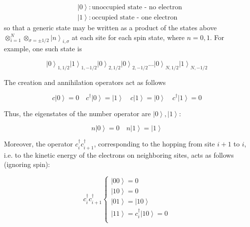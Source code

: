 \documentclass[10pt, twocolumn, twoside]{article}
\begin{document}
\begin{equation}
\begin{split}
&\left| 0 \right\rangle : \text{unoccupied state - no electron} \\
&\left| 1 \right\rangle : \text{occupied state - one electron}
\end{split}
\end{equation}
so that a generic state may be written as a product of the states above $\otimes_{i=1}^N \otimes_{\sigma = \pm 1/2} \left| n \right\rangle_{i, \sigma}$ at each site for each spin state, where $n= 0, 1$. For example, one such state is

\begin{equation}
\left| 0 \right\rangle_{1, 1/2} \left| 1 \right\rangle_{1, -1/2} \left| 0 \right\rangle_{2, 1/2} \left| 0 \right\rangle_{2, -1/2} ... \left| 0 \right\rangle_{N, 1/2} \left| 1 \right\rangle_{N, -1/2} 
\end{equation}

The creation and annihilation operators act as follows

\begin{equation}
c \left| 0 \right\rangle = 0 \quad c^\dagger \left| 0 \right\rangle = \left| 1 \right\rangle \quad c \left| 1 \right\rangle = \left| 0 \right\rangle \quad c^\dagger \left| 1 \right\rangle = 0
\end{equation}

Thus, the eigenstates of the number operator are $\left| 0 \right\rangle, \left| 1 \right\rangle$:

\begin{equation}
n \left| 0 \right\rangle = 0 \quad n \left| 1 \right\rangle = \left| 1 \right\rangle
\end{equation}

Moreover, the operator $c_i^\dagger c_{i+1}^\dagger$, corresponding to the hopping from site $i+1$ to $i$, i.e. to the kinetic energy of the electrons on neighboring sites, acts as follows (ignoring spin):

\begin{equation}
c_i^\dagger c_{i+1}^\dagger \begin{cases}
\left|0 0 \right\rangle = 0 \\
\left|1 0 \right\rangle =  0 \\
\left|0 1 \right\rangle =  \left| 1 0 \right\rangle \\
\left|1 1 \right\rangle =  c_i^\dagger \left| 1 0  \right\rangle = 0 \\
\end{cases}
\end{equation}
\end{document}
